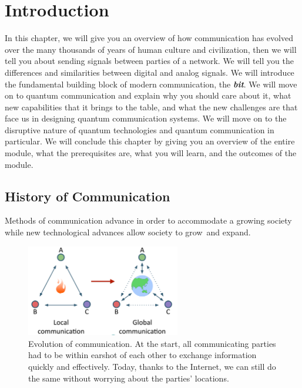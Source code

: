 \chapter[Introduction]{Introduction}
\label{sec:1_Introduction}


In this chapter, we will give you an overview of how communication has evolved over the many thousands of years of human culture and civilization, then we will tell you about sending signals between parties of a network.
We will tell you the differences and similarities between digital and analog signals.
We will introduce the fundamental building block of modern communication, the \textbf{\emph{bit}}.
We will move on to quantum communication and explain why you should care about it, what new capabilities that it brings to the table, and what the new challenges are that face us in designing quantum communication systems. 
We will move on to the disruptive nature of quantum technologies and quantum communication in particular.
We will conclude this chapter by giving you an overview of the entire module, what the prerequisites are, what you will learn, and the outcomes of the module.


\section{History of Communication}

Methods of communication advance in order to accommodate a growing society while new technological advances allow society to grow and expand.

\begin{figure}[ht]
    \centering
    \includegraphics[width=0.6\textwidth]{lesson1/communication.pdf}
    \caption[Evolution of communication.]{Evolution of communication. At the start, all communicating parties had to be within earshot of each other to exchange information quickly and effectively. Today, thanks to the Internet, we can still do the same without worrying about the parties' locations.}
    \label{fig:1-1_communication}
\end{figure}

